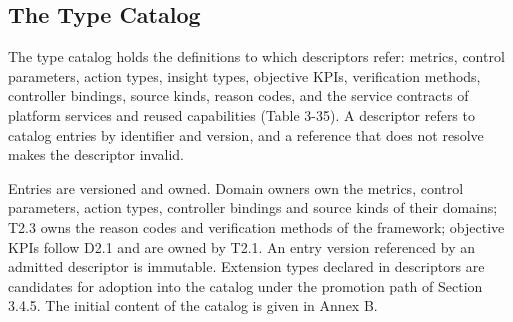 \hypertarget{the-type-catalog}{%
\subsection{The Type Catalog}\label{the-type-catalog}}

The type catalog holds the definitions to which descriptors refer:
metrics, control parameters, action types, insight types, objective
KPIs, verification methods, controller bindings, source kinds, reason
codes, and the service contracts of platform services and reused
capabilities (Table 3-35). A descriptor refers to catalog entries by
identifier and version, and a reference that does not resolve makes the
descriptor invalid.

Entries are versioned and owned. Domain owners own the metrics, control
parameters, action types, controller bindings and source kinds of their
domains; T2.3 owns the reason codes and verification methods of the
framework; objective KPIs follow D2.1 and are owned by T2.1. An entry
version referenced by an admitted descriptor is immutable. Extension
types declared in descriptors are candidates for adoption into the
catalog under the promotion path of Section 3.4.5. The initial content
of the catalog is given in Annex B.

